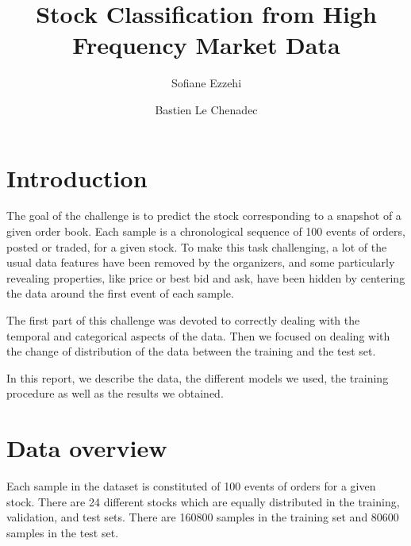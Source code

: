 \documentclass[switch, 11pt]{article}
\title{Stock Classification from High Frequency Market Data}
\author[1]{Sofiane Ezzehi}
\author[1]{Bastien Le Chenadec}
\affil[1]{École des Ponts ParisTech, Master MVA}
\begin{document}
\maketitle

\begin{multicols}{2}
    \section{Introduction}

    The goal of the challenge is to predict the stock corresponding to a snapshot of a given order book. Each sample is a chronological sequence of 100 events of orders, posted or traded, for a given stock. To make this task challenging, a lot of the usual data features have been removed by the organizers, and some particularly revealing properties, like price or best bid and ask, have been hidden by centering the data around the first event of each sample.

    The first part of this challenge was devoted to correctly dealing with the temporal and categorical aspects of the data. Then we focused on dealing with the change of distribution of the data between the training and the test set.

    In this report, we describe the data, the different models we used, the training procedure as well as the results we obtained.

    \section{Data overview}

    Each sample in the dataset is constituted of 100 events of orders for a given stock. There are 24 different stocks which are equally distributed in the training, validation, and test sets. There are 160800 samples in the training set and 80600 samples in the test set.


\end{multicols}
\end{document}

